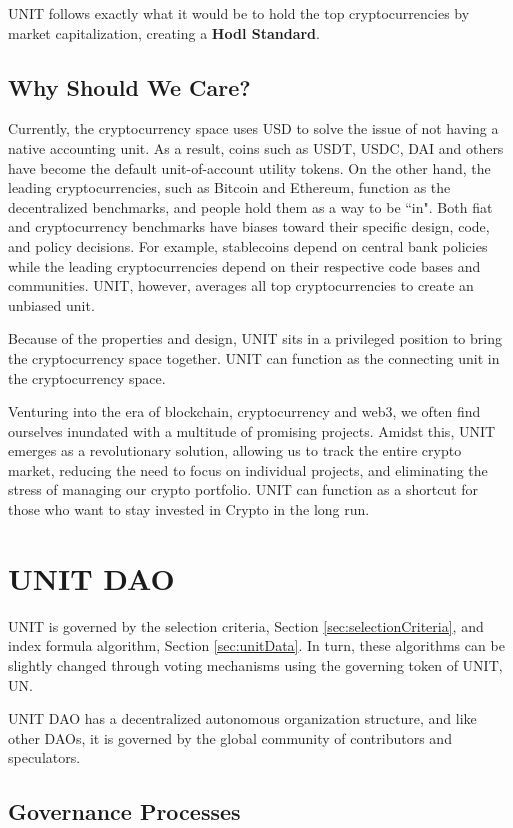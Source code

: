 \documentclass[12pt]{article}
\begin{document}
UNIT follows exactly what it would be to hold the top cryptocurrencies by market capitalization, creating a {\bf Hodl Standard}. 

\subsection{Why Should We Care?}

Currently, the cryptocurrency space uses USD to solve the issue of not having a native accounting unit. As a result, coins such as USDT, USDC, DAI and others have become the default unit-of-account utility tokens. On the other hand, the leading cryptocurrencies, such as Bitcoin and Ethereum, function as the decentralized benchmarks, and people hold them as a way to be ``in". Both fiat and cryptocurrency benchmarks have biases toward their specific design, code, and policy decisions. For example, stablecoins depend on central bank policies while the leading cryptocurrencies depend on their respective code bases and communities. UNIT, however, averages all top cryptocurrencies to create an unbiased unit.

Because of the properties and design, UNIT sits in a privileged position to bring the cryptocurrency space together. UNIT can function as the connecting unit in the cryptocurrency space.

Venturing into the era of blockchain, cryptocurrency and web3, we often find ourselves inundated with a multitude of promising projects. Amidst this, UNIT emerges as a revolutionary solution, allowing us to track the entire crypto market, reducing the need to focus on individual projects, and eliminating the stress of managing our crypto portfolio. UNIT can function as a shortcut for those who want to stay invested in Crypto in the long run.

\section{UNIT DAO}

UNIT is governed by the selection criteria, Section \ref{sec:selectionCriteria}, and index formula algorithm, Section \ref{sec:unitData}. In turn, these algorithms can be slightly changed through voting mechanisms using the governing token of UNIT, UN.

UNIT DAO has a decentralized autonomous organization structure, and like other DAOs, it is governed by the global community of contributors and speculators. 

\subsection{Governance Processes}
\end{document}
